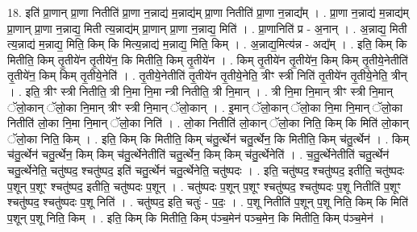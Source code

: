 \documentclass[17pt]{extarticle}
\begin{document}
18. इति॑ प्रा॒णान् प्रा॒णा नितीति॑ प्रा॒णा न॒न्नाद्य॑ म॒न्नाद्य॑म् प्रा॒णा नितीति॑ प्रा॒णा न॒न्नाद्य᳚म् । . प्रा॒णा न॒न्नाद्य॑ म॒न्नाद्य॑म् प्रा॒णान् प्रा॒णा न॒न्नाद्य॒ मिती त्य॒न्नाद्य॑म् प्रा॒णान् प्रा॒णा न॒न्नाद्य॒ मिति॑ । . प्रा॒णानिति॑ प्र - अ॒नान् । . अ॒न्नाद्य॒ मिती त्य॒न्नाद्य॑ म॒न्नाद्य॒ मिति॒ किम् कि मित्य॒न्नाद्य॑ म॒न्नाद्य॒ मिति॒ किम् । . अ॒न्नाद्य॒मित्य॑न्न - अद्य᳚म् । . इति॒ किम् कि मितीति॒ किम् तृ॒तीये॑न तृ॒तीये॑न॒ कि मितीति॒ किम् तृ॒तीये॑न । . किम् तृ॒तीये॑न तृ॒तीये॑न॒ किम् किम् तृ॒तीये॒नेतीति॑ तृ॒तीये॑न॒ किम् किम् तृ॒तीये॒नेति॑ । . तृ॒तीये॒नेतीति॑ तृ॒तीये॑न तृ॒तीये॒नेति॒ त्रीꣳ स्त्री निति॑ तृ॒तीये॑न तृ॒तीये॒नेति॒ त्रीन् । . इति॒ त्रीꣳ स्त्री नितीति॒ त्री नि॒मा नि॒मा न्त्री नितीति॒ त्री नि॒मान् । . त्री नि॒मा नि॒मान् त्रीꣳ स्त्री नि॒मान् ॅलो॒कान् ॅलो॒का नि॒मान् त्रीꣳ स्त्री नि॒मान् ॅलो॒कान् । . इ॒मान् ॅलो॒कान् ॅलो॒का नि॒मा नि॒मान् ॅलो॒का नितीति॑ लो॒का नि॒मा नि॒मान् ॅलो॒का निति॑ । . लो॒का नितीति॑ लो॒कान् ॅलो॒का निति॒ किम् कि मिति॑ लो॒कान् ॅलो॒का निति॒ किम् । . इति॒ किम् कि मितीति॒ किम् च॑तु॒र्त्थेन॑ चतु॒र्त्थेन॒ कि मितीति॒ किम् च॑तु॒र्त्थेन॑ । . किम् च॑तु॒र्त्थेन॑ चतु॒र्त्थेन॒ किम् किम् च॑तु॒र्त्थेनेतीति॑ चतु॒र्त्थेन॒ किम् किम् च॑तु॒र्त्थेनेति॑ । . च॒तु॒र्त्थेनेतीति॑ चतु॒र्त्थेन॑ चतु॒र्त्थेनेति॒ चतु॑ष्पद॒ श्चतु॑ष्पद॒ इति॑ चतु॒र्त्थेन॑ चतु॒र्त्थेनेति॒ चतु॑ष्पदः । . इति॒ चतु॑ष्पद॒ श्चतु॑ष्पद॒ इतीति॒ चतु॑ष्पदः प॒शून् प॒शूꣳ श्चतु॑ष्पद॒ इतीति॒ चतु॑ष्पदः प॒शून् । . चतु॑ष्पदः प॒शून् प॒शूꣳ श्चतु॑ष्पद॒ श्चतु॑ष्पदः प॒शू नितीति॑ प॒शूꣳ श्चतु॑ष्पद॒ श्चतु॑ष्पदः प॒शू निति॑ । . चतु॑ष्पद॒ इति॒ चतुः॑ - प॒दः॒ । . प॒शू नितीति॑ प॒शून् प॒शू निति॒ किम् कि मिति॑ प॒शून् प॒शू निति॒ किम् । . इति॒ किम् कि मितीति॒ किम् प॑ञ्च॒मेन॑ पञ्च॒मेन॒ कि मितीति॒ किम् प॑ञ्च॒मेन॑ । \newline
\end{document}
